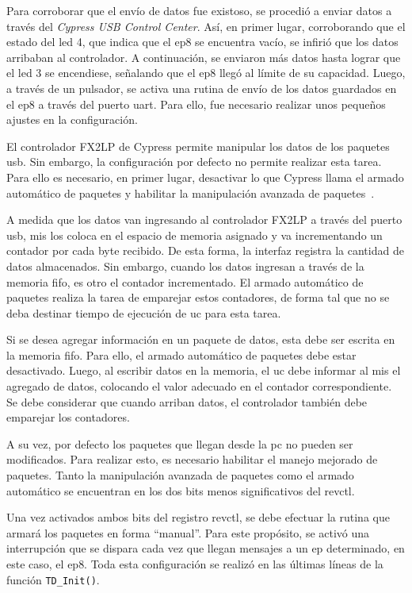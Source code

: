 	Para corroborar que el envío de datos fue existoso, se procedió a enviar datos a través del {\it Cypress USB Control Center}. Así, en primer lugar, corroborando que el estado del \acrshort{led} 4, que indica que el \acrshort{ep}8 se encuentra vacío, se infirió que los datos arribaban al controlador. A continuación, se enviaron más datos hasta lograr que el \acrshort{led} 3 se encendiese, señalando que el \acrshort{ep}8 llegó al límite de su capacidad. Luego, a través de un pulsador, se activa una rutina de envío de los datos guardados en el \acrshort{ep}8 a través del puerto \acrshort{uart}. Para ello, fue necesario realizar unos pequeños ajustes en la configuración.
	
	El controlador FX2LP de Cypress permite manipular los datos de los paquetes \acrshort{usb}. Sin embargo, la configuración por defecto no permite realizar esta tarea. Para ello es necesario, en primer lugar, desactivar lo que Cypress llama el armado automático de paquetes y habilitar la manipulación avanzada de paquetes~\cite{CypressSemiconductor2014fx2lp}.
	
	A medida que los datos van ingresando al controlador FX2LP a través del puerto \acrshort{usb}, \acrshort{mis} los coloca en el espacio de memoria asignado y va incrementando un contador por cada byte recibido. De esta forma, la interfaz registra la cantidad de datos almacenados. Sin embargo, cuando los datos ingresan a través de la memoria \acrshort{fifo}, es otro el contador incrementado. El armado automático de paquetes realiza la tarea de emparejar estos contadores, de forma tal que no se deba destinar tiempo de ejecución de \acrshort{uc} para esta tarea. 
	
	Si se desea agregar información en un paquete de datos, esta debe ser escrita en la memoria \acrshort{fifo}. Para ello, el armado automático de paquetes debe estar desactivado. Luego, al escribir datos en la memoria, el \acrshort{uc} debe informar al \acrshort{mis} el agregado de datos, colocando el valor adecuado en el contador correspondiente. Se debe considerar que cuando arriban datos, el controlador también debe emparejar los contadores.
	
	A su vez, por defecto los paquetes que llegan desde la \acrshort{pc} no pueden ser modificados. Para realizar esto, es necesario habilitar el manejo mejorado de paquetes. Tanto la manipulación avanzada de paquetes como el armado automático se encuentran en los dos bits menos significativos del \acrfull{revctl}.
	
	Una vez activados ambos bits del registro \acrshort{revctl}, se debe efectuar la rutina que armará los paquetes en forma ``manual''. Para este propósito, se activó una interrupción que se dispara cada vez que llegan mensajes a un \acrshort{ep} determinado, en este caso, el \acrshort{ep}8. Toda esta configuración se realizó en las últimas líneas de la función \verb|TD_Init()|.
	
%	
